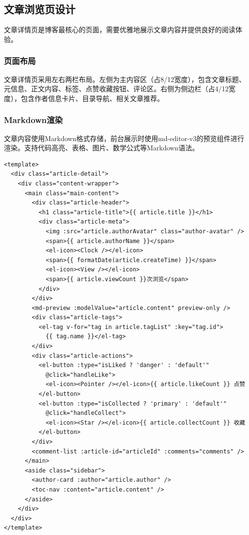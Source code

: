 \documentclass[12pt,a4paper]{article}
\begin{document}
\subsection{文章浏览页设计}

文章详情页是博客最核心的页面，需要优雅地展示文章内容并提供良好的阅读体验。

\subsubsection{页面布局}

文章详情页采用左右两栏布局。左侧为主内容区（占8/12宽度），包含文章标题、元信息、正文内容、标签、点赞收藏按钮、评论区。右侧为侧边栏（占4/12宽度），包含作者信息卡片、目录导航、相关文章推荐。

\subsubsection{Markdown渲染}

文章内容使用Markdown格式存储，前台展示时使用md-editor-v3的预览组件进行渲染。支持代码高亮、表格、图片、数学公式等Markdown语法。

\begin{lstlisting}[language={}, basicstyle=\ttfamily\small, caption=文章详情页代码]
<template>
  <div class="article-detail">
    <div class="content-wrapper">
      <main class="main-content">
        <div class="article-header">
          <h1 class="article-title">{{ article.title }}</h1>
          <div class="article-meta">
            <img :src="article.authorAvatar" class="author-avatar" />
            <span>{{ article.authorName }}</span>
            <el-icon><Clock /></el-icon>
            <span>{{ formatDate(article.createTime) }}</span>
            <el-icon><View /></el-icon>
            <span>{{ article.viewCount }}次浏览</span>
          </div>
        </div>
        <md-preview :modelValue="article.content" preview-only />
        <div class="article-tags">
          <el-tag v-for="tag in article.tagList" :key="tag.id">
            {{ tag.name }}</el-tag>
        </div>
        <div class="article-actions">
          <el-button :type="isLiked ? 'danger' : 'default'"
            @click="handleLike">
            <el-icon><Pointer /></el-icon>{{ article.likeCount }} 点赞
          </el-button>
          <el-button :type="isCollected ? 'primary' : 'default'"
            @click="handleCollect">
            <el-icon><Star /></el-icon>{{ article.collectCount }} 收藏
          </el-button>
        </div>
        <comment-list :article-id="articleId" :comments="comments" />
      </main>
      <aside class="sidebar">
        <author-card :author="article.author" />
        <toc-nav :content="article.content" />
      </aside>
    </div>
  </div>
</template>
\end{lstlisting}
\end{document}
